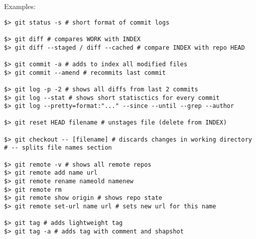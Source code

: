\documentclass[a4paper, 12pt]{article}
\begin{document}
Examples:
\begin{lstlisting}
$> git status -s # short format of commit logs

$> git diff # compares WORK with INDEX
$> git diff --staged / diff --cached # compare INDEX with repo HEAD

$> git commit -a # adds to index all modified files
$> git commit --amend # recommits last commit

$> git log -p -2 # shows all diffs from last 2 commits
$> git log --stat # shows short statisctics for every commit
$> git log --pretty=format:"..." --since --until --grep --author

$> git reset HEAD filename # unstages file (delete from INDEX)

$> git checkout -- [filename] # discards changes in working directory
# -- splits file names section

$> git remote -v # shows all remote repos
$> git remote add name url
$> git remote rename nameold namenew
$> git remote rm
$> git remote show origin # shows repo state
$> git remote set-url name url # sets new url for this name

$> git tag # adds lightweight tag
$> git tag -a # adds tag with comment and shapshot
\end{lstlisting}
\end{document}
